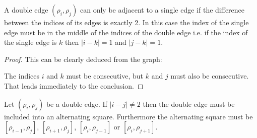 \begin{proposition}
  \label{adjacent-double}
  A double edge $(\rho_i, \rho_j)$ can only be adjacent to a single edge if the difference between the indices of its edges is exactly 2. In this case the index of the single edge must be in the middle of the indices of the double edge i.e. if the index of the single edge is $k$ then $|i-k| = 1$ and $|j-k| = 1$.
\end{proposition}

\begin{proof}
  This can be clearly deduced from the graph:

  \begin{figure}[H]
    \begin{center}
      \caption{}
    \end{center}
  \end{figure}

  The indices $i$ and $k$ must be consecutive, but $k$ and $j$ must also be consecutive. That leads immediately to the conclusion.

\end{proof}

\begin{corollary}
  \label{continue-double-edge}
  Let $(\rho_i, \rho_j)$ be a double edge. If $|i - j| \neq 2$ then the double edge must be included into an alternating square. Furthermore the alternating square must be  $[\rho_{i-1}, \rho_j]$, $[\rho_{i+1}, \rho_j]$, $[\rho_i, \rho_{j-1}]$ or $[\rho_i, \rho_{j+1}]$.
\end{corollary}

